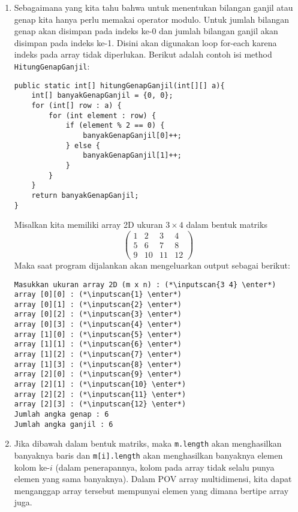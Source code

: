 \documentclass[10pt,openany,a4paper]{article}
\newcommand{\enter}{\raisebox{-1.8pt}{\begin{tikzpicture}[scale=0.2]
    \draw[thin,fill=lightgray] (0,0) rectangle (2,1);
    \draw (0.3,0.3) -- (0.7,0.3)--(0.7,0.6);     
\end{tikzpicture}}}
\newcommand{\inputscan}[1]{\raisebox{0pt}[1pt]{\colorbox{darkgray}{#1}}}
\begin{document}
\begin{enumerate}
    \item Sebagaimana yang kita tahu bahwa untuk menentukan bilangan ganjil atau genap kita hanya perlu memakai operator modulo. Untuk jumlah bilangan genap akan disimpan pada indeks ke-0 dan jumlah bilangan ganjil akan disimpan pada indeks ke-1. Disini akan digunakan loop for-each karena indeks pada array tidak diperlukan. Berikut adalah contoh isi method \texttt{HitungGenapGanjil}:
    \begin{verbatim}
public static int[] hitungGenapGanjil(int[][] a){
	int[] banyakGenapGanjil = {0, 0};
    for (int[] row : a) { 
        for (int element : row) { 
            if (element % 2 == 0) {
                banyakGenapGanjil[0]++;
            } else {
                banyakGenapGanjil[1]++; 
            }
        }
    }
	return banyakGenapGanjil;
}
    \end{verbatim}
    Misalkan kita memiliki array 2D ukuran $3\times 4$ dalam bentuk matriks
    \[\begin{pmatrix}
    1 & 2 & 3 & 4\\
    5 & 6 & 7 & 8\\
    9 & 10 & 11 & 12
    \end{pmatrix}\]
    Maka saat program dijalankan akan mengeluarkan output sebagai berikut:
    \begin{lstlisting}[style=output]
Masukkan ukuran array 2D (m x n) : (*\inputscan{3 4} \enter*)
array [0][0] : (*\inputscan{1} \enter*)
array [0][1] : (*\inputscan{2} \enter*)
array [0][2] : (*\inputscan{3} \enter*)
array [0][3] : (*\inputscan{4} \enter*)
array [1][0] : (*\inputscan{5} \enter*)
array [1][1] : (*\inputscan{6} \enter*)
array [1][2] : (*\inputscan{7} \enter*)
array [1][3] : (*\inputscan{8} \enter*)
array [2][0] : (*\inputscan{9} \enter*)
array [2][1] : (*\inputscan{10} \enter*)
array [2][2] : (*\inputscan{11} \enter*)
array [2][3] : (*\inputscan{12} \enter*)
Jumlah angka genap : 6
Jumlah angka ganjil : 6
    \end{lstlisting}
    \item Jika dibawah dalam bentuk matriks, maka \texttt{m.length} akan menghasilkan banyaknya baris dan \texttt{m[i].length} akan menghasilkan banyaknya elemen kolom ke-$i$ (dalam penerapannya, kolom pada array tidak selalu punya elemen yang sama banyaknya). Dalam POV array multidimensi, kita dapat menganggap array tersebut mempunyai elemen yang dimana bertipe array juga.\\

\end{enumerate}
\end{document}
